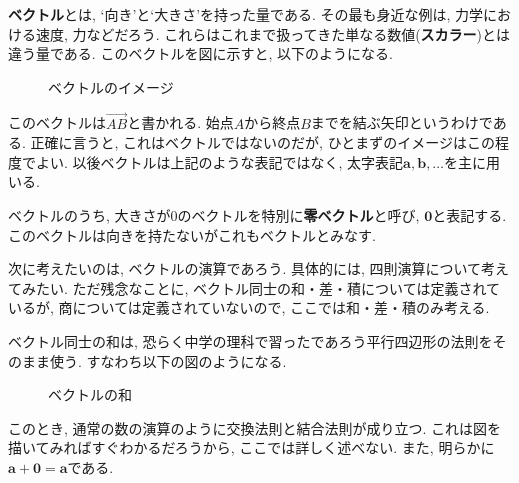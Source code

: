         \textbf{ベクトル}とは, `向き'と`大きさ'を持った量である. その最も身近な例は, 力学における速度, 力などだろう.
        これらはこれまで扱ってきた単なる数値(\textbf{スカラー})とは違う量である. このベクトルを図に示すと, 以下のようになる.
        \begin{figure}[h]
            \centering
            \caption{ベクトルのイメージ}
        \end{figure}

        このベクトルは$\overrightarrow{AB}$と書かれる. 始点$A$から終点$B$までを結ぶ矢印というわけである. 正確に言うと, これはベクトルではないのだが, ひとまずのイメージはこの程度でよい. 
        以後ベクトルは上記のような表記ではなく, 太字表記$\bm{a},\bm{b},\dots$を主に用いる.

        ベクトルのうち, 大きさが0のベクトルを特別に\textbf{零ベクトル}と呼び, $\bm{0}$と表記する. このベクトルは向きを持たないがこれもベクトルとみなす.

        次に考えたいのは, ベクトルの演算であろう. 具体的には, 四則演算について考えてみたい. ただ残念なことに, ベクトル同士の和・差・積については定義されているが, 商については定義されていないので, 
        ここでは和・差・積のみ考える.

        ベクトル同士の和は, 恐らく中学の理科で習ったであろう平行四辺形の法則をそのまま使う. すなわち以下の図のようになる.
        \begin{figure}[h]
            \centering
            \caption{ベクトルの和}
        \end{figure}
        このとき, 通常の数の演算のように交換法則と結合法則が成り立つ. これは図を描いてみればすぐわかるだろうから, ここでは詳しく述べない. また, 明らかに$\bm{a}+\bm{0}=\bm{a}$である.

